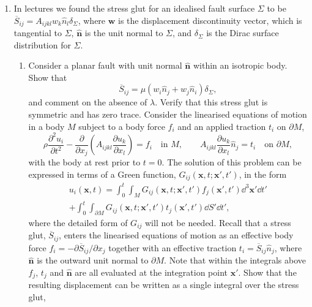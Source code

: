 \begin{enumerate}
\item In lectures we found the stress glut for an idealised fault surface $\Sigma$ to be $\overline{S}_{ij}=A_{ijkl}w_{k}\hat{n}_{l}\delta_{\Sigma}$, where $\mathbf{w}$ is the displacement discontinuity vector, which is tangential to $\Sigma$, $\hat{\mathbf{n}}$ is the unit normal to $\Sigma$, and $\delta_{\Sigma}$ is the Dirac surface distribution for $\Sigma$.
\begin{enumerate}
    \item Consider a planar fault with unit normal $\hat{\mathbf{n}}$ within an isotropic body. Show that
    \begin{equation*}
        \overline{S}_{ij}=\mu(w_{i}\hat{n}_{j}+w_{j}\hat{n}_{i})\delta_{\Sigma},
    \end{equation*}
    and comment on the absence of $\lambda$. Verify that this stress glut is symmetric and has zero trace.
    \hardp Consider the linearised equations of motion in a body $M$ subject to a body force $f_{i}$ and an applied traction $t_{i}$ on $\partial M$,
    \begin{equation*}
        \rho\frac{\partial^{2}u_{i}}{\partial t^{2}}-\frac{\partial}{\partial x_{j}}\left(A_{ijkl}\frac{\partial u_{k}}{\partial x_{l}}\right)=f_{i}\quad\text{in }M,\qquad A_{ijkl}\frac{\partial u_{k}}{\partial x_{l}}\hat{n}_{j}=t_{i}\quad\text{on }\partial M,
    \end{equation*}
    with the body at rest prior to $t=0$. The solution of this problem can be expressed in terms of a Green function, $G_{ij}(\mathbf{x},t;\mathbf{x}',t')$, in the form
    \begin{multline*}
        u_{i}(\mathbf{x},t)=\int_{0}^{t}\int_{M}G_{ij}(\mathbf{x},t;\mathbf{x}',t')f_{j}(\mathbf{x}',t')\dd^{3}\mathbf{x}'\dd t' \\
        +\int_{0}^{t}\int_{\partial M}G_{ij}(\mathbf{x},t;\mathbf{x}',t')t_{j}(\mathbf{x}',t')\dd S'\dd t',
    \end{multline*}
    where the detailed form of $G_{ij}$ will not be needed. Recall that a stress glut, $\overline{S}_{ij}$, enters the linearised equations of motion as an effective body force $f_{i}=-\partial\overline{S}_{ij}/\partial x_{j}$ together with an effective traction $t_{i}=\overline{S}_{ij}\hat{n}_{j}$, where $\hat{\mathbf{n}}$ is the outward unit normal to $\partial M$. Note that within the integrals above $f_{j}$, $t_{j}$ and $\hat{\mathbf{n}}$ are all evaluated at the integration point $\mathbf{x}'$. Show that the resulting displacement can be written as a single integral over the stress glut,

\end{enumerate}
\end{enumerate}
